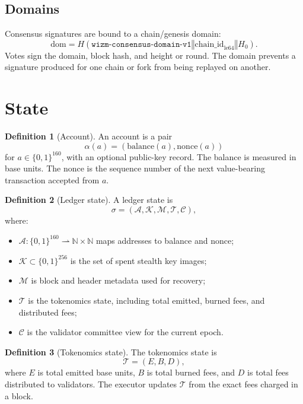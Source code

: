 \documentclass[11pt,a4paper]{article}
\theoremstyle{definition}
\newtheorem{definition}{Definition}[section]
\theoremstyle{plain}
\newcommand{\B}{\{0,1\}}
\newcommand{\Bclx}{\B^{160}}
\newcommand{\Bccxxxii}{\B^{256}}
\newcommand{\concat}{\mathbin{\Vert}}
\newcommand{\N}{\mathbb{N}}
\begin{document}
\subsection{Domains}

Consensus signatures are bound to a chain/genesis domain:
\[
  \mathrm{dom} = H(\texttt{wizm-consensus-domain-v1}\concat
  \mathrm{chain\_id}_{\mathrm{le64}}\concat H_0).
\]
Votes sign the domain, block hash, and height or round. The domain prevents a
signature produced for one chain or fork from being replayed on another.

\section{State}

\begin{definition}[Account]
An account is a pair
\[
  \alpha(a)=(\mathrm{balance}(a),\mathrm{nonce}(a))
\]
for $a\in\Bclx$, with an optional public-key record. The balance is measured in
base units. The nonce is the sequence number of the next value-bearing
transaction accepted from $a$.
\end{definition}

\begin{definition}[Ledger state]
A ledger state is
\[
  \sigma = (\mathcal{A},\mathcal{K},\mathcal{M},\mathcal{T},\mathcal{C}),
\]
where:
\begin{itemize}[leftmargin=*]
  \item $\mathcal{A}:\Bclx\rightharpoonup \N\times\N$ maps addresses to
        balance and nonce;
  \item $\mathcal{K}\subset\Bccxxxii$ is the set of spent stealth key images;
  \item $\mathcal{M}$ is block and header metadata used for recovery;
  \item $\mathcal{T}$ is the tokenomics state, including total emitted,
        burned fees, and distributed fees;
  \item $\mathcal{C}$ is the validator committee view for the current epoch.
\end{itemize}
\end{definition}

\begin{definition}[Tokenomics state]
The tokenomics state is
\[
  \mathcal{T}=(E,B,D),
\]
where $E$ is total emitted base units, $B$ is total burned fees, and $D$ is
total fees distributed to validators. The executor updates $\mathcal{T}$ from
the exact fees charged in a block.
\end{definition}
\end{document}
